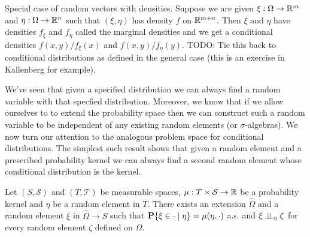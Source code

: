 Special case of random vectors with densities.  Suppose we are given
$\xi : \Omega \to \mathbb{R}^m$ and $\eta: \Omega \to \mathbb{R}^n$ such that
$(\xi,\eta)$ has density $f$ on $\mathbb{R}^{m+n}$.  Then $\xi$ and $\eta$ have
densities $f_{\xi}$ and $f_\eta$ called the marginal densities and we
get a conditional densities $f(x,y)/f_\xi(x)$ and $f(x,y)/f_\eta(y)$.
TODO: Tie this back to conditional distributions as defined in the
general case (this is an exercise in Kallenberg for example).

We've seen that given a specified distribution we can always find a
random variable with that specfied distribution.  Moreover, we know
that if we allow ourselves to to extend the probability space then we
can construct such a random variable to be independent of any existing
random elements (or $\sigma$-algebras).  We now turn our attention to
the analogous problem space for conditional distributions.  The
simplest such result shows that given a random element and a
prescribed probability kernel we can always find a second random
element whose conditional distribution is the kernel.
\begin{lem}Let $(S, \mathcal{S})$ and $(T, \mathcal{T})$ be measurable
  spaces, $\mu : T \times \mathcal{S} \to \mathbb{R}$ be a
  probability kernel and $\eta$ be a random element in $T$.  There
  exists an extension $\hat{\Omega}$ and a random element $\xi$ in
  $\hat{\Omega} \to S$
  such that $\textbf{P}\{\xi \in \cdot \mid \eta\} = \mu(\eta, \cdot)$
  a.s.   and $\xi \perp \! \! \! \perp_{\eta} \zeta$ for every random element
  $\zeta$ defined on $\Omega$.
\end{lem}
